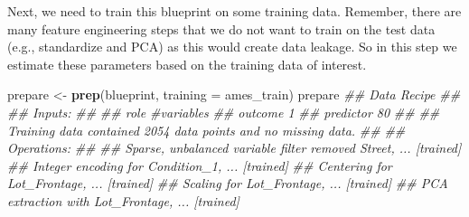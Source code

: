 \documentclass[]{krantz}
\makeatletter
\newenvironment{Shaded}{\begin{snugshade}}{\end{snugshade}}
\newcommand{\CommentTok}[1]{\textcolor[rgb]{0.37,0.37,0.37}{\textit{#1}}}
\newcommand{\DataTypeTok}[1]{\textcolor[rgb]{0.27,0.27,0.27}{#1}}
\newcommand{\KeywordTok}[1]{\textcolor[rgb]{0.27,0.27,0.27}{\textbf{#1}}}
\newcommand{\NormalTok}[1]{#1}
\newcommand{\OperatorTok}[1]{\textcolor[rgb]{0.43,0.43,0.43}{\textbf{#1}}}
\newcommand{\StringTok}[1]{\textcolor[rgb]{0.5,0.5,0.5}{#1}}
\newenvironment{kframe}{%
\medskip{}
\setlength{\fboxsep}{.8em}
 \def\at@end@of@kframe{}%
 \ifinner\ifhmode%
  \def\at@end@of@kframe{\end{minipage}}%
  \begin{minipage}{\columnwidth}%
 \fi\fi%
 \def\FrameCommand##1{\hskip\@totalleftmargin \hskip-\fboxsep
 \colorbox{shadecolor}{##1}\hskip-\fboxsep
     \hskip-\linewidth \hskip-\@totalleftmargin \hskip\columnwidth}%
 \MakeFramed {\advance\hsize-\width
   \@totalleftmargin\z@ \linewidth\hsize
   \@setminipage}}%
 {\par\unskip\endMakeFramed%
 \at@end@of@kframe}
\renewenvironment{Shaded}{\begin{kframe}}{\end{kframe}}
\makeatother
\begin{document}
\begin{Shaded}
\end{Shaded}

Next, we need to train this blueprint on some training data. Remember, there are many feature engineering steps that we do not want to train on the test data (e.g., standardize and PCA) as this would create data leakage. So in this step we estimate these parameters based on the training data of interest.

\begin{Shaded}
\begin{Highlighting}[]
\NormalTok{prepare <-}\StringTok{ }\KeywordTok{prep}\NormalTok{(blueprint, }\DataTypeTok{training =}\NormalTok{ ames_train)}
\NormalTok{prepare}
\CommentTok{## Data Recipe}
\CommentTok{## }
\CommentTok{## Inputs:}
\CommentTok{## }
\CommentTok{##       role #variables}
\CommentTok{##    outcome          1}
\CommentTok{##  predictor         80}
\CommentTok{## }
\CommentTok{## Training data contained 2054 data points and no missing data.}
\CommentTok{## }
\CommentTok{## Operations:}
\CommentTok{## }
\CommentTok{## Sparse, unbalanced variable filter removed Street, ... [trained]}
\CommentTok{## Integer encoding for Condition_1, ... [trained]}
\CommentTok{## Centering for Lot_Frontage, ... [trained]}
\CommentTok{## Scaling for Lot_Frontage, ... [trained]}
\CommentTok{## PCA extraction with Lot_Frontage, ... [trained]}
\end{Highlighting}
\end{Shaded}
\end{document}
